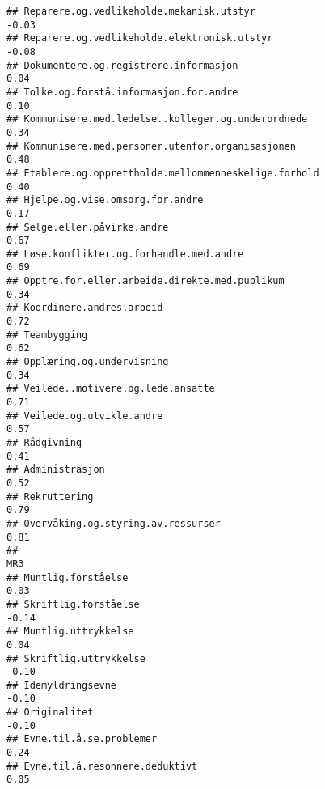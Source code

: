 \documentclass[
]{article}
\begin{document}
\begin{verbatim}
## Reparere.og.vedlikeholde.mekanisk.utstyr                                         -0.03
## Reparere.og.vedlikeholde.elektronisk.utstyr                                      -0.08
## Dokumentere.og.registrere.informasjon                                             0.04
## Tolke.og.forstå.informasjon.for.andre                                             0.10
## Kommunisere.med.ledelse..kolleger.og.underordnede                                 0.34
## Kommunisere.med.personer.utenfor.organisasjonen                                   0.48
## Etablere.og.opprettholde.mellommenneskelige.forhold                               0.40
## Hjelpe.og.vise.omsorg.for.andre                                                   0.17
## Selge.eller.påvirke.andre                                                         0.67
## Løse.konflikter.og.forhandle.med.andre                                            0.69
## Opptre.for.eller.arbeide.direkte.med.publikum                                     0.34
## Koordinere.andres.arbeid                                                          0.72
## Teambygging                                                                       0.62
## Opplæring.og.undervisning                                                         0.34
## Veilede..motivere.og.lede.ansatte                                                 0.71
## Veilede.og.utvikle.andre                                                          0.57
## Rådgivning                                                                        0.41
## Administrasjon                                                                    0.52
## Rekruttering                                                                      0.79
## Overvåking.og.styring.av.ressurser                                                0.81
##                                                                                    MR3
## Muntlig.forståelse                                                                0.03
## Skriftlig.forståelse                                                             -0.14
## Muntlig.uttrykkelse                                                               0.04
## Skriftlig.uttrykkelse                                                            -0.10
## Idemyldringsevne                                                                 -0.10
## Originalitet                                                                     -0.10
## Evne.til.å.se.problemer                                                           0.24
## Evne.til.å.resonnere.deduktivt                                                    0.05

\end{verbatim}
\end{document}
